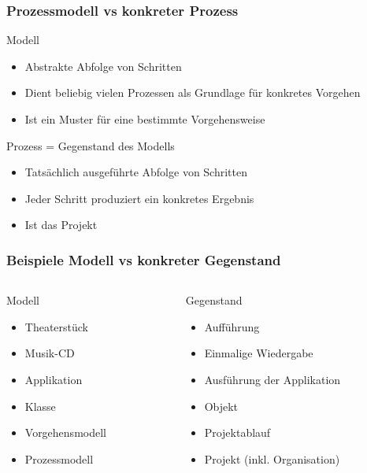 \begin{frame}
\frametitle{Prozessmodell vs konkreter Prozess}
	Modell
		\begin{itemize}
			\item Abstrakte Abfolge von Schritten
			\item Dient beliebig vielen Prozessen als Grundlage für konkretes Vorgehen
			\item Ist ein Muster für eine bestimmte Vorgehensweise
		\end{itemize}
	\bigskip
	Prozess = Gegenstand des Modells
		\begin{itemize}
			\item Tatsächlich ausgeführte Abfolge von Schritten
			\item Jeder Schritt produziert ein konkretes Ergebnis
			\item Ist das Projekt
		\end{itemize}
\end{frame}

\begin{frame}
\frametitle{Beispiele Modell vs konkreter Gegenstand}
	\begin{columns}
		\begin{column}{0.5\textwidth}
		Modell
			\small
			\begin{itemize}
				\item Theaterstück
				\item Musik-CD
				\item Applikation
				\item Klasse
				\item Vorgehensmodell
				\item Prozessmodell
			\end{itemize}
			\normalsize
		\end{column}
		\begin{column}{.5\textwidth}
		Gegenstand
			\small
			\begin{itemize}
				\item Aufführung
				\item Einmalige Wiedergabe
				\item Ausführung der Applikation
				\item Objekt
				\item Projektablauf
				\item Projekt (inkl. Organisation)
			\end{itemize}
			\normalsize
		\end{column}
	\end{columns}
\end{frame}

